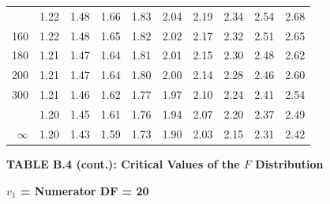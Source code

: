 \documentclass[10pt]{article}
\begin{document}
\begin{longtable}{@{}r!{\vrule width 0.8pt\hspace{0.55em}}rrrrrrrrr@{}}
 & 1.22 & 1.48 & 1.66 & 1.83 & 2.04 & 2.19 & 2.34 & 2.54 & 2.68 \\
160 & 1.22 & 1.48 & 1.65 & 1.82 & 2.02 & 2.17 & 2.32 & 2.51 & 2.65 \\
180 & 1.21 & 1.47 & 1.64 & 1.81 & 2.01 & 2.15 & 2.30 & 2.48 & 2.62 \\
200 & 1.21 & 1.47 & 1.64 & 1.80 & 2.00 & 2.14 & 2.28 & 2.46 & 2.60 \\
300 & 1.21 & 1.46 & 1.62 & 1.77 & 1.97 & 2.10 & 2.24 & 2.41 & 2.54 \\
 & 1.20 & 1.45 & 1.61 & 1.76 & 1.94 & 2.07 & 2.20 & 2.37 & 2.49 \\
$\infty$ & 1.20 & 1.43 & 1.59 & 1.73 & 1.90 & 2.03 & 2.15 & 2.31 & 2.42 \\
\end{longtable}
\newpage
\thispagestyle{empty}
\begin{center}
{\large\bfseries TABLE B.4 (cont.): Critical Values of the $F$ Distribution\par}
\end{center}
{\large\bfseries $v_1$ = Numerator DF = 20\par}
\vspace{0.5em}
\small
\end{document}
